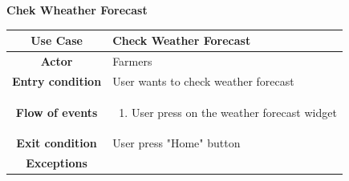 \documentclass[table, 12pt]{article}
\begin{document}
\begin{itemize}
            
            \begin{table}[H]
                \item[] \textbf{Chek Wheather Forecast}
                \item[] 
                \centering
                \begin{tabular}{c m{}}
                    \hline
                    \textbf{Use Case} & Check Weather Forecast\\ \hline
                    \textbf{Actor} & Farmers\\ \hline
                    \textbf{Entry condition} & User wants to check weather forecast\\  \hline
                    \textbf{Flow of events} & \begin{enumerate}
                                                \item User press on the weather forecast widget
                                            \end{enumerate}\\ \hline
                    \textbf{Exit condition} & User press "Home" button\\ \hline
                    \textbf{Exceptions} & \\ \hline                    
                \end{tabular}
            \end{table}


\end{itemize}
\end{document}
